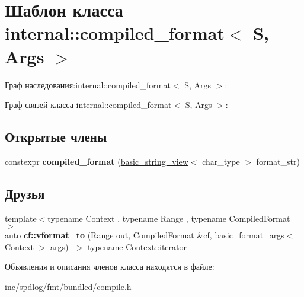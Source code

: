 \hypertarget{classinternal_1_1compiled__format}{}\section{Шаблон класса internal\+:\+:compiled\+\_\+format$<$ S, Args $>$}
\label{classinternal_1_1compiled__format}


Граф наследования\+:internal\+:\+:compiled\+\_\+format$<$ S, Args $>$\+:


Граф связей класса internal\+:\+:compiled\+\_\+format$<$ S, Args $>$\+:
\subsection*{Открытые члены}
\begin{DoxyCompactItemize}
\item 
\mbox{\label{classinternal_1_1compiled__format_a0a1e9e5917b27f11be572232fa05f3ab}} 
constexpr {\bfseries compiled\+\_\+format} (\hyperlink{classbasic__string__view}{basic\+\_\+string\+\_\+view}$<$ char\+\_\+type $>$ format\+\_\+str)
\end{DoxyCompactItemize}
\subsection*{Друзья}
\begin{DoxyCompactItemize}
\item 
\mbox{\label{classinternal_1_1compiled__format_a88a2f9e8f4ae5742ae49278f25b5ea95}} 
{\footnotesize template$<$typename Context , typename Range , typename Compiled\+Format $>$ }\\auto {\bfseries cf\+::vformat\+\_\+to} (Range out, Compiled\+Format \&cf, \hyperlink{classbasic__format__args}{basic\+\_\+format\+\_\+args}$<$ Context $>$ args) -\/$>$ typename Context\+::iterator
\end{DoxyCompactItemize}


Объявления и описания членов класса находятся в файле\+:\begin{DoxyCompactItemize}
\item 
inc/spdlog/fmt/bundled/compile.\+h\end{DoxyCompactItemize}
